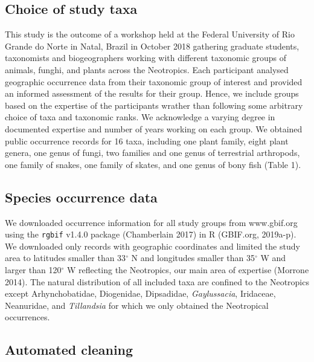 \documentclass[fleqn,10pt,lineno]{wlpeerj} %
\begin{document}
\hypertarget{choice-of-study-taxa}{%
\subsection*{Choice of study taxa}\label{choice-of-study-taxa}}

This study is the outcome of a workshop held at the Federal University of Rio Grande do Norte in Natal, Brazil in October 2018 gathering graduate students, taxonomists and biogeographers working with different taxonomic groups of animals, funghi, and plants across the Neotropics. Each participant analysed geographic occurrence data from their taxonomic group of interest and provided an informed assessment of the results for their group. Hence, we include groups based on the expertise of the participants wrather than following some arbitrary choice of taxa and taxonomic ranks. We acknowledge a varying degree in documented expertise and number of years working on each group. We obtained public occurrence records for 16 taxa, including one plant family, eight plant genera, one genus of fungi, two families and one genus of terrestrial arthropods, one family of snakes, one family of skates, and one genus of bony fish (Table 1).

\hypertarget{species-occurrence-data}{%
\subsection*{Species occurrence data}\label{species-occurrence-data}}

We downloaded occurrence information for all study groups from www.gbif.org using the \texttt{rgbif} v1.4.0 package (Chamberlain 2017) in R (GBIF.org, 2019a-p). We downloaded only records with geographic coordinates and limited the study area to latitudes smaller than 33\(^\circ\) N and longitudes smaller than 35\(^\circ\) W and larger than 120\(^\circ\) W reflecting the Neotropics, our main area of expertise (Morrone 2014). The natural distribution of all included taxa are confined to the Neotropics except Arhynchobatidae, Diogenidae, Dipsadidae, \emph{Gaylussacia}, Iridaceae, Neanuridae, and \emph{Tillandsia} for which we only obtained the Neotropical occurrences.

\hypertarget{automated-cleaning}{%
\subsection*{Automated cleaning}\label{automated-cleaning}}
\end{document}
